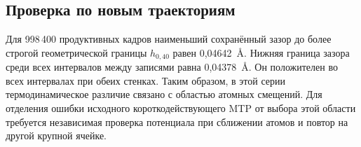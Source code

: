 \documentclass[11pt,a4paper]{article}
\begin{document}
\subsection*{Проверка по новым траекториям}
Для 998\,400 продуктивных кадров наименьший сохранённый зазор до более строгой геометрической границы \(h_{0{,}40}\) равен 0,04642~\AA. Нижняя граница зазора среди всех интервалов между записями равна 0,04378~\AA. Он положителен во всех интервалах при обеих стенках. Таким образом, в этой серии термодинамическое различие связано с областью атомных смещений. Для отделения ошибки исходного короткодействующего MTP от выбора этой области требуется независимая проверка потенциала при сближении атомов и повтор на другой крупной ячейке.
\end{document}
